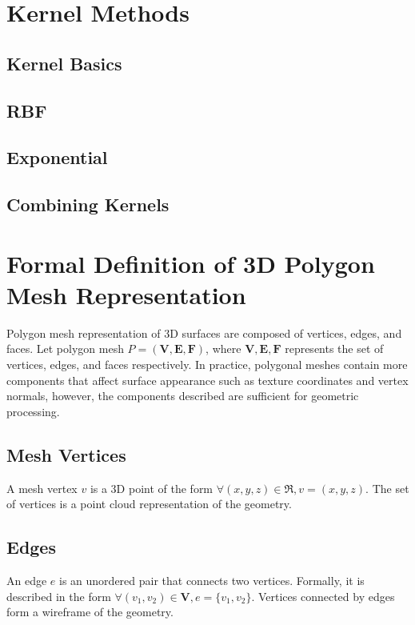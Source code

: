 \documentclass[ %
                    author={Dillon Keith Diep [INCOMPLETE DRAFT, NOT FOR SUBMISSION]},
                supervisor={Dr. Carl Henrik Ek},
                    degree={MEng},
                     title={ART-CG:},
                  subtitle={Assisted Real-Time Content Generation of 3D Hair Geometry},
                      type={Research},
                      year={2014} ]{dissertation}
\begin{document}
\section{Kernel Methods}
\subsection{Kernel Basics}
\subsection{RBF}
\subsection{Exponential}
\subsection{Combining Kernels}

\section{Formal Definition of 3D Polygon Mesh Representation}

Polygon mesh representation of 3D surfaces are composed of vertices, edges, and faces. Let polygon mesh $P = (\mathbf{V, E, F})$, where $\mathbf{V, E, F}$ represents the set of vertices, edges, and faces respectively. In practice, polygonal meshes contain more components that affect surface appearance such as texture coordinates and vertex normals, however, the components described are sufficient for geometric processing.

\subsection{Mesh Vertices}
A mesh vertex $v$ is a 3D point of the form $\forall (x, y, z) \in \Re, v = (x, y, z)$.
The set of vertices is a point cloud representation of the geometry. 

\subsection{Edges}
An edge $e$ is an unordered pair that connects two vertices. Formally, it is described in the form $\forall (v_1, v_2) \in \mathbf{V}, e = \{v_1, v_2\}$. Vertices connected by edges form a wireframe of the geometry. 
\end{document}
